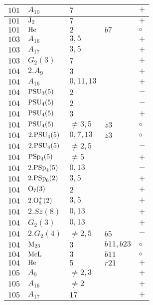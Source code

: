 \documentclass[a4paper, 11pt]{article}
\begin{document}
\begin{longtable}{lllll}
		$101$ & $A_{10}$ & $7$ &  & $+$ \\ \hline
		$101$ & ${\rm J}_2$ & $7$ &  & $+$ \\ \hline
		$101$ & ${\rm He}$ & $2$ & $b7$ & $\circ$ \\ \hline
		$103$ & $A_{16}$ & $3, 5$ &  & $+$ \\ \hline
		$103$ & $A_{17}$ & $3,5$ &  & $+$ \\ \hline
		$103$ & $G_{2}(3)$ & $7$ &  & $+$ \\ \hline
		$104$ & $2.A_{9}$ & $3$ &  & $+$ \\ \hline
		$104$ & $A_{16}$ & $0,11,13$ &  & $+$ \\ \hline
		$104$ & ${\rm PSU}_{3}(5)$ & $2$ &  & $-$ \\ \hline
		$104$ & ${\rm PSU}_{4}(5)$ & $2$ &  & $-$ \\ \hline
		$104$ & ${\rm PSU}_{4}(5)$ & $3$ &  & $+$ \\ \hline
		$104$ & ${\rm PSU}_{4}(5)$ & $\neq 3,5$ & $z3$ & $\circ$ \\ \hline
		$104$ & $2.{\rm PSU}_{4}(5)$ & $0,7,13$ & $z3$ & $\circ$ \\ \hline
		$104$ & $2.{\rm PSU}_{4}(5)$ & $\neq 2,5$ &  & $-$ \\ \hline
		$104$ & ${\rm PSp}_{4}(5)$ & $\neq 5$ &  & $+$ \\ \hline
		$104$ & $2.{\rm PSp}_{4}(5)$ & $0,13$ &  & $-$ \\ \hline
		$104$ & $2.{\rm PSp}_{6}(2)$ & $3, 5$ &  & $+$ \\ \hline
		$104$ & ${\rm O}_{7}(3)$ & $2$ &  & $+$ \\ \hline
		$104$ & $2.{\rm O}_{8}^+(2)$ & $3, 5$ &  & $+$ \\ \hline
		$104$ & $2.Sz(8)$ & $0,13$ &  & $+$ \\ \hline
		$104$ & $G_{2}(3)$ & $0,13$ &  & $+$ \\ \hline
		$104$ & $2.G_{2}(4)$ & $\neq 2,5$ & $b5$ & $-$ \\ \hline
		$104$ & ${\rm M}_{23}$ & $3$ & $b11, b23$ & $\circ$ \\ \hline
		$104$ & ${\rm McL}$ & $3$ & $b11$ & $\circ$ \\ \hline
		$104$ & ${\rm He}$ & $5$ & $r21$ & $+$ \\ \hline
		$105$ & $A_{9}$ & $\neq 2,3$ &  & $+$ \\ \hline
		$105$ & $A_{16}$ & $\neq 2$ &  & $+$ \\ \hline
		$105$ & $A_{17}$ & $17$ &  & $+$ \\ \hline

\end{longtable}
\end{document}
